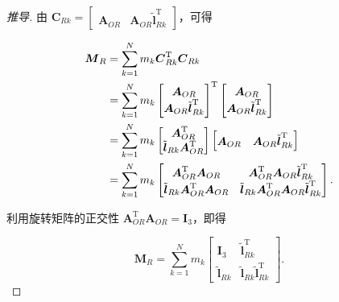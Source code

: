 \begin{proof}[推导]
由 $\boldsymbol{C}_{Rk} = \begin{bmatrix} \boldsymbol{A}_{OR} & \boldsymbol{A}_{OR} \tilde{\boldsymbol{l}}_{Rk}^{\mathrm{T}} \end{bmatrix}$，可得

\begin{align*}\boldsymbol{M}_R &= \sum_{k=1}^{N} m_k \boldsymbol{C}_{Rk}^{\mathrm{T}} \boldsymbol{C}_{Rk} \notag \\
&= \sum_{k=1}^{N} m_k \begin{bmatrix} \boldsymbol{A}_{OR} \\ \boldsymbol{A}_{OR} \tilde{\boldsymbol{l}}_{Rk}^{\mathrm{T}} \end{bmatrix}^{\mathrm{T}} \begin{bmatrix} \boldsymbol{A}_{OR} \\ \boldsymbol{A}_{OR} \tilde{\boldsymbol{l}}_{Rk}^{\mathrm{T}} \end{bmatrix} \notag \\
&= \sum_{k=1}^{N} m_k \begin{bmatrix} \boldsymbol{A}_{OR}^{\mathrm{T}} \\ \tilde{\boldsymbol{l}}_{Rk} \boldsymbol{A}_{OR}^{\mathrm{T}} \end{bmatrix} \begin{bmatrix} \boldsymbol{A}_{OR} & \boldsymbol{A}_{OR} \tilde{\boldsymbol{l}}_{Rk}^{\mathrm{T}} \end{bmatrix} \notag \\
&= \sum_{k=1}^{N} m_k \begin{bmatrix} \boldsymbol{A}_{OR}^{\mathrm{T}}\boldsymbol{A}_{OR} & \boldsymbol{A}_{OR}^{\mathrm{T}}\boldsymbol{A}_{OR} \tilde{\boldsymbol{l}}_{Rk}^{\mathrm{T}} \\ \tilde{\boldsymbol{l}}_{Rk} \boldsymbol{A}_{OR}^{\mathrm{T}}\boldsymbol{A}_{OR} & \tilde{\boldsymbol{l}}_{Rk} \boldsymbol{A}_{OR}^{\mathrm{T}}\boldsymbol{A}_{OR} \tilde{\boldsymbol{l}}_{Rk}^{\mathrm{T}} \end{bmatrix}.\end{align*}

利用旋转矩阵的正交性 $\boldsymbol{A}_{OR}^{\mathrm{T}}\boldsymbol{A}_{OR} = \boldsymbol{I}_3$，即得

\[
\boldsymbol{M}_R = \sum_{k=1}^{N} m_k \begin{bmatrix} \boldsymbol{I}_3 & \tilde{\boldsymbol{l}}_{Rk}^{\mathrm{T}} \\ \tilde{\boldsymbol{l}}_{Rk} & \tilde{\boldsymbol{l}}_{Rk} \tilde{\boldsymbol{l}}_{Rk}^{\mathrm{T}} \end{bmatrix}.
\]
\end{proof}
